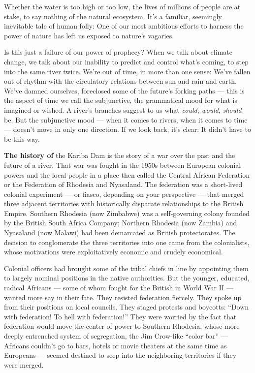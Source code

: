 Whether the water is too high or too low, the lives of millions of
people are at stake, to say nothing of the natural ecosystem. It's a
familiar, seemingly inevitable tale of human folly: One of our most
ambitious efforts to harness the power of nature has left us exposed to
nature's vagaries.

Is this just a failure of our power of prophecy? When we talk about
climate change, we talk about our inability to predict and control
what's coming, to step into the same river twice. We're out of time, in
more than one sense: We've fallen out of rhythm with the circulatory
relations between sun and rain and earth. We've damned ourselves,
foreclosed some of the future's forking paths --- this is the aspect of
time we call the subjunctive, the grammatical mood for what is imagined
or wished. A river's branches suggest to us what \emph{could},
\emph{would}, \emph{should} be. But the subjunctive mood --- when it
comes to rivers, when it comes to time --- doesn't move in only one
direction. If we look back, it's clear: It didn't have to be this way.

\textbf{The history of} the Kariba Dam is the story of a war over the
past and the future of a river. That war was fought in the 1950s between
European colonial powers and the local people in a place then called the
Central African Federation or the Federation of Rhodesia and Nyasaland.
The federation was a short-lived colonial experiment --- or fiasco,
depending on your perspective --- that merged three adjacent territories
with historically disparate relationships to the British Empire.
Southern Rhodesia (now Zimbabwe) was a self-governing colony founded by
the British South Africa Company; Northern Rhodesia (now Zambia) and
Nyasaland (now Malawi) had been demarcated as British protectorates. The
decision to conglomerate the three territories into one came from the
colonialists, whose motivations were exploitatively economic and crudely
economical.

Colonial officers had brought some of the tribal chiefs in line by
appointing them to largely nominal positions in the native authorities.
But the younger, educated, radical Africans --- some of whom fought for
the British in World War II --- wanted more say in their fate. They
resisted federation fiercely. They spoke up from their positions on
local councils. They staged protests and boycotts: ``Down with
federation! To hell with federation!'' They were worried by the fact
that federation would move the center of power to Southern Rhodesia,
whose more deeply entrenched system of segregation, the Jim Crow-like
``color bar'' --- Africans couldn't go to bars, hotels or movie theaters
at the same time as Europeans --- seemed destined to seep into the
neighboring territories if they were merged.

